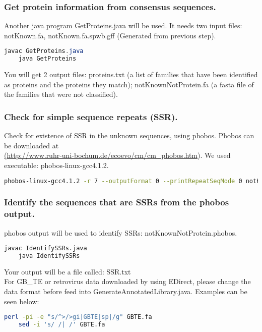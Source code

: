 \documentclass[a4paper,12pt]{article}
\begin{document}
	\pagebreak
	
	\subsubsection{Get protein information from consensus sequences.}
	Another java program GetProteins.java will be used. It needs two input files: notKnown.fa, notKnown.fa.spwb.gff (Generated from previous step).
	\begin{lstlisting}[language=java]
	javac GetProteins.java
	java GetProteins \end{lstlisting}
	You will get 2 output files: proteins.txt (a list of families that have been identified as proteins and the proteins they match);
	notKnownNotProtein.fa (a fasta file of the families that were not classified).
	
	\subsubsection{Check for simple sequence repeats (SSR).}
	Check for existence of SSR in the unknown sequences, using phobos. Phobos can be downloaded at \\ \href{<url>}(\url{http://www.ruhr-uni-bochum.de/ecoevo/cm/cm_phobos.htm}). We used executable: phobos-linux-gcc4.1.2.\\
	
	\begin{lstlisting}[language=bash]
	phobos-linux-gcc4.1.2 -r 7 --outputFormat 0 --printRepeatSeqMode 0 notKnownNotProtein.fa > notKnownNotProtein.phobos \end{lstlisting}
	
	\subsubsection{Identify the sequences that are SSRs from the phobos output.}
	phobos output will be used to identify SSRs: notKnownNotProtein.phobos.
	\begin{lstlisting}[language=bash]
	javac IdentifySSRs.java
	java IdentifySSRs \end{lstlisting}
	Your output will be a file called: SSR.txt \\
	
  For GB\_TE or retrovirus data downloaded by using EDirect, please change the data format before feed into GenerateAnnotatedLibrary.java. Examples can be seen below: 
	\begin{lstlisting}[language=bash]
	perl -pi -e "s/^>/>gi|GBTE|sp|/g" GBTE.fa
	sed -i 's/ /| /' GBTE.fa \end{lstlisting}
	
\end{document}
